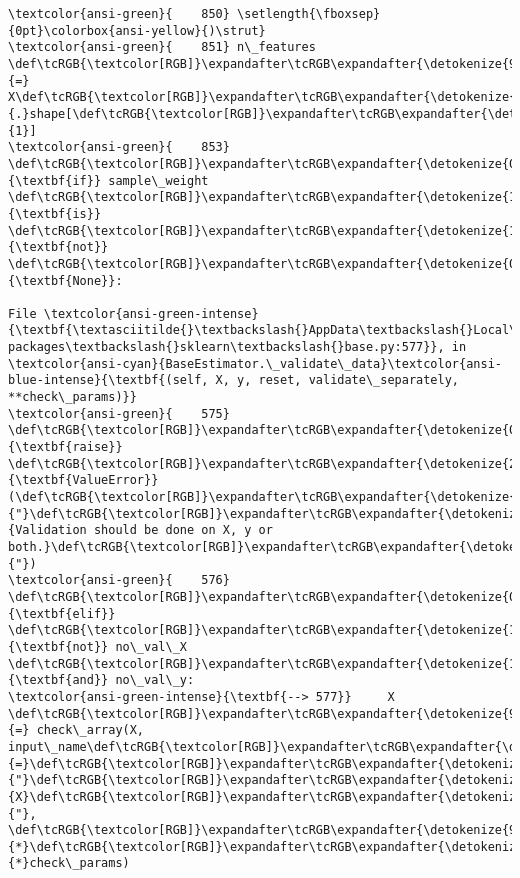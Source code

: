 \documentclass[11pt]{article}
\begin{document}
\begin{Verbatim}[commandchars=\\\{\}, frame=single, framerule=2mm, rulecolor=\color{outerrorbackground}]
\textcolor{ansi-green}{    850} \setlength{\fboxsep}{0pt}\colorbox{ansi-yellow}{)\strut}
\textcolor{ansi-green}{    851} n\_features \def\tcRGB{\textcolor[RGB]}\expandafter\tcRGB\expandafter{\detokenize{98,98,98}}{=} X\def\tcRGB{\textcolor[RGB]}\expandafter\tcRGB\expandafter{\detokenize{98,98,98}}{.}shape[\def\tcRGB{\textcolor[RGB]}\expandafter\tcRGB\expandafter{\detokenize{98,98,98}}{1}]
\textcolor{ansi-green}{    853} \def\tcRGB{\textcolor[RGB]}\expandafter\tcRGB\expandafter{\detokenize{0,135,0}}{\textbf{if}} sample\_weight \def\tcRGB{\textcolor[RGB]}\expandafter\tcRGB\expandafter{\detokenize{175,0,255}}{\textbf{is}} \def\tcRGB{\textcolor[RGB]}\expandafter\tcRGB\expandafter{\detokenize{175,0,255}}{\textbf{not}} \def\tcRGB{\textcolor[RGB]}\expandafter\tcRGB\expandafter{\detokenize{0,135,0}}{\textbf{None}}:

File \textcolor{ansi-green-intense}{\textbf{\textasciitilde{}\textbackslash{}AppData\textbackslash{}Local\textbackslash{}Programs\textbackslash{}Python\textbackslash{}Python310\textbackslash{}lib\textbackslash{}site-packages\textbackslash{}sklearn\textbackslash{}base.py:577}}, in \textcolor{ansi-cyan}{BaseEstimator.\_validate\_data}\textcolor{ansi-blue-intense}{\textbf{(self, X, y, reset, validate\_separately, **check\_params)}}
\textcolor{ansi-green}{    575}     \def\tcRGB{\textcolor[RGB]}\expandafter\tcRGB\expandafter{\detokenize{0,135,0}}{\textbf{raise}} \def\tcRGB{\textcolor[RGB]}\expandafter\tcRGB\expandafter{\detokenize{215,95,95}}{\textbf{ValueError}}(\def\tcRGB{\textcolor[RGB]}\expandafter\tcRGB\expandafter{\detokenize{175,0,0}}{"}\def\tcRGB{\textcolor[RGB]}\expandafter\tcRGB\expandafter{\detokenize{175,0,0}}{Validation should be done on X, y or both.}\def\tcRGB{\textcolor[RGB]}\expandafter\tcRGB\expandafter{\detokenize{175,0,0}}{"})
\textcolor{ansi-green}{    576} \def\tcRGB{\textcolor[RGB]}\expandafter\tcRGB\expandafter{\detokenize{0,135,0}}{\textbf{elif}} \def\tcRGB{\textcolor[RGB]}\expandafter\tcRGB\expandafter{\detokenize{175,0,255}}{\textbf{not}} no\_val\_X \def\tcRGB{\textcolor[RGB]}\expandafter\tcRGB\expandafter{\detokenize{175,0,255}}{\textbf{and}} no\_val\_y:
\textcolor{ansi-green-intense}{\textbf{--> 577}}     X \def\tcRGB{\textcolor[RGB]}\expandafter\tcRGB\expandafter{\detokenize{98,98,98}}{=} check\_array(X, input\_name\def\tcRGB{\textcolor[RGB]}\expandafter\tcRGB\expandafter{\detokenize{98,98,98}}{=}\def\tcRGB{\textcolor[RGB]}\expandafter\tcRGB\expandafter{\detokenize{175,0,0}}{"}\def\tcRGB{\textcolor[RGB]}\expandafter\tcRGB\expandafter{\detokenize{175,0,0}}{X}\def\tcRGB{\textcolor[RGB]}\expandafter\tcRGB\expandafter{\detokenize{175,0,0}}{"}, \def\tcRGB{\textcolor[RGB]}\expandafter\tcRGB\expandafter{\detokenize{98,98,98}}{*}\def\tcRGB{\textcolor[RGB]}\expandafter\tcRGB\expandafter{\detokenize{98,98,98}}{*}check\_params)

\end{Verbatim}
\end{document}
